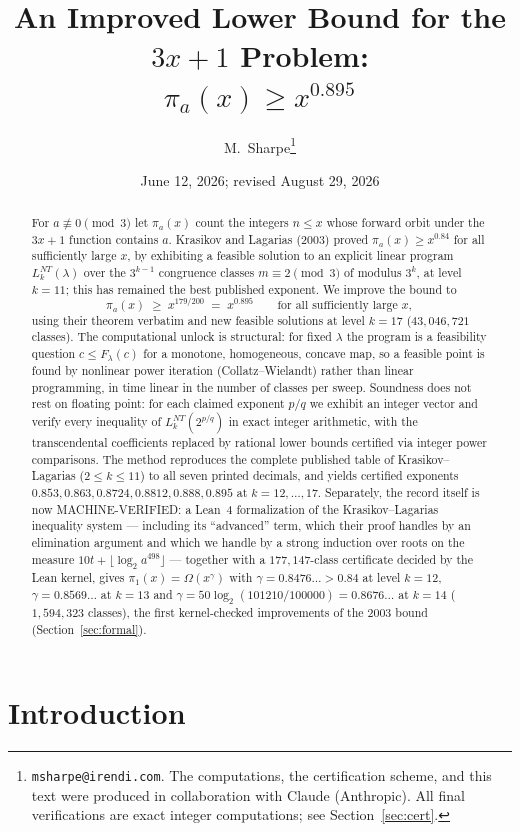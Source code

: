 \documentclass[11pt]{article}
\title{An Improved Lower Bound for the $3x+1$ Problem:\\
       $\pi_a(x) \ge x^{0.895}$}
\author{M.~Sharpe\thanks{\texttt{msharpe@irendi.com}. The computations,
  the certification scheme, and this text were produced in collaboration
  with Claude (Anthropic). All final verifications are exact integer
  computations; see Section~\ref{sec:cert}.}}
\date{June 12, 2026; revised August 29, 2026}
\begin{document}
\maketitle

\begin{abstract}
For $a \not\equiv 0 \pmod 3$ let $\pi_a(x)$ count the integers
$n \le x$ whose forward orbit under the $3x+1$ function contains $a$.
Krasikov and Lagarias (2003) proved $\pi_a(x) \ge x^{0.84}$ for all
sufficiently large $x$, by exhibiting a feasible solution to an
explicit linear program $L_k^{NT}(\lambda)$ over the
$3^{k-1}$ congruence classes $m \equiv 2 \pmod 3$ of modulus $3^k$, at
level $k = 11$; this has remained the best published exponent. We
improve the bound to
\[
\pi_a(x) \;\ge\; x^{179/200} \;=\; x^{0.895}
\qquad \text{for all sufficiently large } x,
\]
using their theorem verbatim and new feasible solutions at level
$k = 17$ ($43{,}046{,}721$ classes). The computational unlock is
structural: for fixed $\lambda$ the program is a feasibility question
$c \le F_\lambda(c)$ for a monotone, homogeneous, concave map, so a
feasible point is found by nonlinear power iteration
(Collatz--Wielandt) rather than linear programming, in time linear in
the number of classes per sweep. Soundness does not rest on floating
point: for each claimed exponent $p/q$ we exhibit an integer vector
and verify every inequality of $L_k^{NT}(2^{p/q})$ in exact integer
arithmetic, with the transcendental coefficients replaced by rational
lower bounds certified via integer power comparisons. The method
reproduces the complete published table of Krasikov--Lagarias
($2 \le k \le 11$) to all seven printed decimals, and yields certified
exponents $0.853, 0.863, 0.8724, 0.8812, 0.888, 0.895$ at
$k = 12, \dots, 17$. Separately, the record itself is now MACHINE-VERIFIED: a Lean~4
formalization of the Krasikov--Lagarias inequality system --- including
its ``advanced'' term, which their proof handles by an elimination
argument and which we handle by a strong induction over roots on the
measure $10t + \lfloor \log_2 a^{498}\rfloor$ --- together with a
$177{,}147$-class certificate decided by the Lean kernel, gives
$\pi_1(x) = \Omega(x^{\gamma})$ with
$\gamma = 0.8476\ldots > 0.84$ at level $k = 12$, $\gamma =
0.8569\ldots$ at $k = 13$ and $\gamma = 50\log_2(101210/100000) =
0.8676\ldots$ at $k = 14$ ($1{,}594{,}323$ classes), the first
kernel-checked improvements of the 2003 bound
(Section~\ref{sec:formal}).
\end{abstract}

\section{Introduction}
\end{document}
